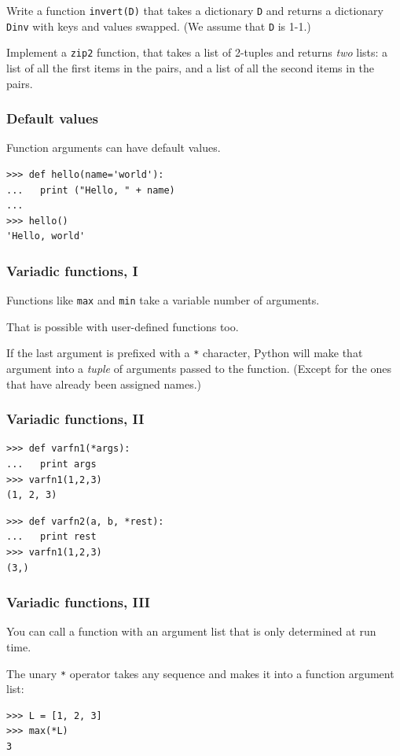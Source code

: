 \documentclass[english,serif,mathserif,xcolor=pdftex,dvipsnames,table]{beamer}
\begin{document}
\begin{frame}
  \begin{exercise}
    Write a function \texttt{invert(D)} that takes a dictionary
    \texttt{D} and returns a dictionary \texttt{Dinv} with keys and
    values swapped. (We assume that \texttt{D} is 1-1.)
  \end{exercise}

  \+
  \begin{exercise}
    Implement a \texttt{zip2} function, that takes a list of 2-tuples
    and returns \emph{two} lists: a list of all the first items in the
    pairs, and a list of all the second items in the pairs.
  \end{exercise}
\end{frame}


\begin{frame}[fragile]
  \frametitle{Default values}

  Function arguments can have default values.
\begin{lstlisting}
>>> def hello(name='world'):
...   print ("Hello, " + name)
...
>>> hello()
'Hello, world'
\end{lstlisting}
\end{frame}


\begin{frame}[fragile]
  \frametitle{Variadic functions, I}
  Functions like \texttt{max} and \texttt{min} take a variable number of arguments.

  \+
  That is possible with user-defined functions too.

  \+
  If the last argument is prefixed with a \texttt{*} character,
  Python will make that argument into a \emph{tuple} of arguments
  passed to the function. (Except for the ones that have already been
  assigned names.)
\end{frame}


\begin{frame}
  \frametitle{Variadic functions, II}
\begin{lstlisting}
>>> def varfn1(*args):
...   print args
>>> varfn1(1,2,3)
(1, 2, 3)
\end{lstlisting}

\begin{lstlisting}
>>> def varfn2(a, b, *rest):
...   print rest
>>> varfn1(1,2,3)
(3,)
\end{lstlisting}
\end{frame}


\begin{frame}[fragile]
  \frametitle{Variadic functions, III}
  You can call a function with an argument list that is only
  determined at run time.

  \+
  The unary \texttt{*} operator takes any sequence and makes it
  into a function argument list:
\begin{lstlisting}
>>> L = [1, 2, 3]
>>> max(*L)
3
\end{lstlisting}
\end{frame}
\end{document}
